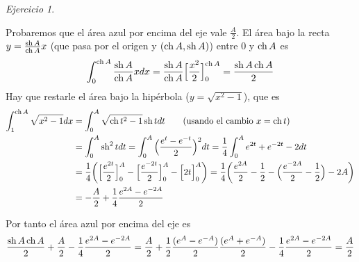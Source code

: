 \documentclass[12pt,spanish]{article}
\theoremstyle{definition}
\theoremstyle{remark}
\newtheorem{exercise}{Ejercicio}
\begin{document}
\begin{exercise}
\begin{enumerate}[i)]
    Probaremos que el área azul por encima del eje vale $\frac{A}{2}$.
    El área bajo la recta $y=\frac{\operatorname{sh} A}{\operatorname{ch} A}x$ (que pasa por el
    origen y $(\operatorname{ch} A,\operatorname{sh} A)$) entre $0$ y $\operatorname{ch} A$ es
    \[\int_0^{\operatorname{ch} A} \frac{\operatorname{sh} A}{\operatorname{ch} A}xdx=\frac{\operatorname{sh} A}{\operatorname{ch}
        A}\Big[\frac{x^2}{2}\Big]_0^{\operatorname{ch} A}=\frac{\operatorname{sh} A\operatorname{ch} A}{2}\] Hay
    que restarle el área bajo la hipérbola ($y=\sqrt{x^2-1}$), que es
    \begin{align*}\int_1^{\operatorname{ch} A}\sqrt{x^2-1}dx&=\int_0^A\sqrt{\operatorname{ch}
                                                t^2-1}\operatorname{sh} t dt \qquad\text{(usando el cambio $x=\operatorname{ch} t$)} \\
                                              &=\int_0^A \operatorname{sh}^2t dt=\int_0^A \Big(\frac{e^t-e^{-t}}{2}\Big)^2 dt = \frac{1}{4}\int_0^A e^{2t}+e^{-2t}-2dt \\
                                              &=\frac{1}{4}\bigg(\Big[\frac{e^{2t}}{2}\Big]_0^A-\Big[\frac{e^{-2t}}{2}\Big]_0^A-\Big[2t\Big]_0^A\bigg) = \frac{1}{4}\bigg(\frac{e^{2A}}{2}-\frac{1}{2}-\Big(\frac{e^{-2A}}{2}-\frac{1}{2}\Big)-2A\bigg) \\
      &= -\frac{A}{2} +\frac{1}{4} \frac{e^{2A}-e^{-2A}}{2}
    \end{align*}

    Por tanto el área azul por encima del eje es
    \begin{align*}
      \frac{\operatorname{sh} A\operatorname{ch} A}{2} +\frac{A}{2} - \frac{1}{4} \frac{e^{2A}-e^{-2A}}{2} = \frac{A}{2} + \frac{1}{2}\frac{(e^A-e^{-A})}{2}\frac{(e^A+e^{-A})}{2}-\frac{1}{4}\frac{e^{2A}-e^{-2A}}{2}=\frac{A}{2}
    \end{align*}

    
  \end{enumerate}
\end{exercise}

\newcommand{\T}{T_1(\mathbb{S}^2)}
\newcommand{\E}{\mathcal{E}_*(e)}
\end{document}
